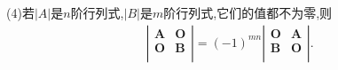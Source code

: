 \documentclass[lang=cn,newtx,10pt,scheme=chinese]{elegantbook}
\begin{document}
\begin{proposition}
(4)若\(\vert A\vert\)是\(n\)阶行列式,\(\vert B\vert\)是\(m\)阶行列式,它们的值都不为零,则
\begin{align*}
    \left| \left. \begin{matrix}
        \boldsymbol{A}&		\boldsymbol{O}\\
        \boldsymbol{O}&		\boldsymbol{B}\\
    \end{matrix} \right. \right|=\left( -1 \right) ^{mn}\left. \left| \begin{matrix}
        \boldsymbol{O}&		\boldsymbol{A}\\
        \boldsymbol{B}&		\boldsymbol{O}\\
    \end{matrix} \right| \right. .
\end{align*}
\end{proposition}
\end{document}
